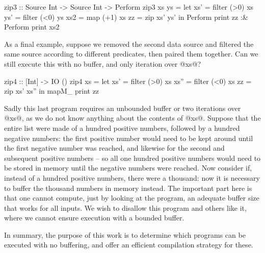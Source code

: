 \begin{code}
zip3 :: Source Int -> Source Int -> Perform
zip3 xs ys
 = let xs'  = filter (>0) xs
       ys'  = filter (<0) ys
       xs2  = map    (+1) xs
       zz   = zip xs' ys'
   in  Perform print      zz
   :&  Perform print      xs2
\end{code}

As a final example, suppose we removed the second data source and filtered the same source according to different predicates, then paired them together.
Can we still execute this with no buffer, and only iteration over @xs@?

\begin{code}
zip4 :: [Int] -> IO ()
zip4 xs
 = let xs'  = filter (>0) xs
       xs'' = filter (<0) xs
       zz   = zip xs' xs''
   in  mapM_ print        zz
\end{code}

Sadly this last program requires an unbounded buffer or two iterations over @xs@, as we do not know anything about the contents of @xs@.
Suppose that the entire list were made of a hundred positive numbers, followed by a hundred negative numbers: the first positive number would need to be kept around until the first negative number was reached, and likewise for the second and subsequent positive numbers -- so all one hundred positive numbers would need to be stored in memory until the negative numbers were reached.
Now consider if, instead of a hundred positive numbers, there were a thousand: now it is necessary to buffer the thousand numbers in memory instead.
The important part here is that one cannot compute, just by looking at the program, an adequate buffer size that works for all inputs.
We wish to disallow this program and others like it, where we cannot ensure execution with a bounded buffer.

In summary, the purpose of this work is to determine which programs can be executed with no buffering, and offer an efficient compilation strategy for these.


